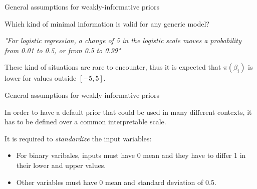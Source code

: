 \documentclass{beamer}
\begin{document}
\begin{frame}{General assumptions for weakly-informative priors}
	
	 Which kind of minimal information is valid for any generic model?
	
	\vspace{0.2cm}
	
	\textit{"For logistic regression, a change of 5 in the logistic scale moves a probability from 0.01 to 0.5, or from 0.5 to 0.99"}
	
	
	
	These kind of situations are rare to encounter, thus  it is expected that $\pi(\beta_i)$ is lower for values outside $ [-5, 5]$.
	
\end{frame}


\begin{frame}{General assumptions for weakly-informative priors}
	
	In order to have a default prior that could be used in many different contexts, it has to be defined over a common interpretable scale.
	
	\vspace{0.4cm}
	It is required to \textit{standardize} the input variables:
	\begin{itemize}
		\item For binary varibales, inputs must have 0 mean and they have to differ 1 in their lower and upper values.
		\item Other variables must have 0 mean and standard deviation of 0.5.
	\end{itemize}
	
\end{frame}
\end{document}

